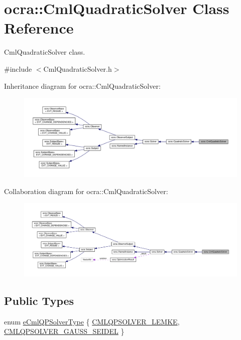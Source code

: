 \hypertarget{classocra_1_1CmlQuadraticSolver}{}\section{ocra\+:\+:Cml\+Quadratic\+Solver Class Reference}
\label{classocra_1_1CmlQuadraticSolver}


Cml\+Quadratic\+Solver class.  




{\ttfamily \#include $<$Cml\+Quadratic\+Solver.\+h$>$}



Inheritance diagram for ocra\+:\+:Cml\+Quadratic\+Solver\+:
\nopagebreak
\begin{figure}[H]
\begin{center}
\leavevmode
\includegraphics[width=350pt]{d9/d05/classocra_1_1CmlQuadraticSolver__inherit__graph}
\end{center}
\end{figure}


Collaboration diagram for ocra\+:\+:Cml\+Quadratic\+Solver\+:
\nopagebreak
\begin{figure}[H]
\begin{center}
\leavevmode
\includegraphics[width=350pt]{dd/d29/classocra_1_1CmlQuadraticSolver__coll__graph}
\end{center}
\end{figure}
\subsection*{Public Types}
\begin{DoxyCompactItemize}
\item 
enum \hyperlink{classocra_1_1CmlQuadraticSolver_a6d54dc2e4dac085099b002c88cb6d3df}{e\+Cml\+Q\+P\+Solver\+Type} \{ \hyperlink{classocra_1_1CmlQuadraticSolver_a6d54dc2e4dac085099b002c88cb6d3dfac7ab4857986d549d2c7ac2f4e7d834cc}{C\+M\+L\+Q\+P\+S\+O\+L\+V\+E\+R\+\_\+\+L\+E\+M\+KE}, 
\hyperlink{classocra_1_1CmlQuadraticSolver_a6d54dc2e4dac085099b002c88cb6d3dfa53afe853cc16e5023a4618d57cb082f1}{C\+M\+L\+Q\+P\+S\+O\+L\+V\+E\+R\+\_\+\+G\+A\+U\+S\+S\+\_\+\+S\+E\+I\+D\+EL}
 \}
\end{DoxyCompactItemize}
